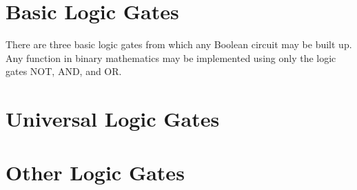 \documentclass[
	a4paper, %
	10pt, %
]{report}
\begin{document}

		

		{\let\clearpage\relax \tableofcontents}
		

		
		\clearpage %

		
		
		\section{Basic Logic Gates}
			There are three basic logic gates from which any Boolean circuit may be built up. 
			Any function in binary mathematics may be implemented using only the logic gates NOT, AND, and OR.
			
			
			

		\newpage
		\section{Universal Logic Gates}
			
			
			

		\newpage
		\section{Other Logic Gates}
			
		

\end{document}

